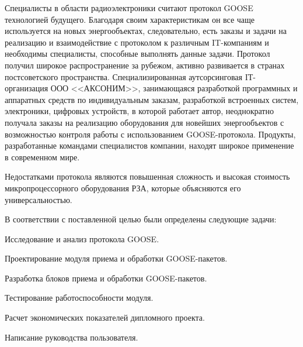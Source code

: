 Специалисты в области радиоэлектроники считают протокол GOOSE технологией будущего.
Благодаря своим характеристикам он все чаще используется на новых энергообъектах,
следовательно, есть заказы и задачи на реализацию и взаимодействие с протоколом к различным IT-компаниям и необходимы специалисты,
способные выполнять данные задачи. Протокол получил широкое распространение за рубежом, активно развивается в странах постсоветского пространства.
Специализированная аутсорсинговая IТ-организация ООО <<АКСОНИМ>>, занимающаяся разработкой программных и аппаратных средств по индивидуальным заказам,
разработкой встроенных систем, электроники, цифровых устройств, в которой работает автор, неоднократно получала заказы на реализацию оборудования
для новейших энергообъектов с возможностью контроля работы с использованием GOOSE-протокола. Продукты,
разработанные командами специалистов компании, находят широкое применение в современном мире.

Недостатками протокола являются повышенная сложность и высокая стоимость микропроцессорного оборудования РЗА, которые объясняются его универсальностью.

В соответствии с поставленной целью были определены следующие задачи:
\begin{enumerate_num}
    \item Исследование и анализ протокола GOOSE.
    \item Проектирование модуля приема и обработки GOOSE-пакетов.
    \item Разработка блоков приема и обработки GOOSE-пакетов.
    \item Тестирование работоспособности модуля.
    \item Расчет экономических показателей дипломного проекта.
    \item Написание руководства пользователя.
\end{enumerate_num}
